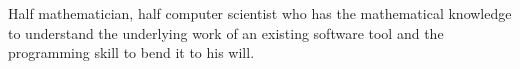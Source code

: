 

\begin{cvparagraph}

Half mathematician, half computer scientist who has the mathematical knowledge to understand the underlying work of an 
existing software tool and the programming skill to bend it to his will.\\
\end{cvparagraph}
